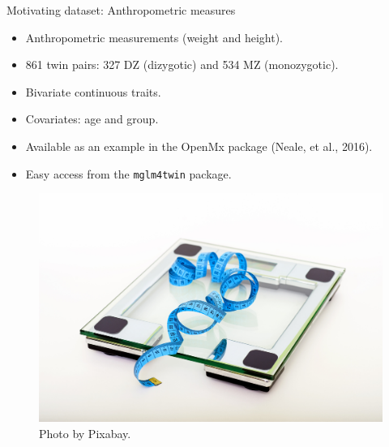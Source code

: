 \documentclass[
  ignorenonframetext,
  serif,
  professionalfont,
  usenames,
  dvipsnames,
  aspectratio = 169]{beamer}
\providecommand{\tightlist}{%
  \setlength{\itemsep}{0pt}\setlength{\parskip}{0pt}}
\renewcommand{\tightlist}{%
  \setlength{\itemsep}{0\baselineskip}
  \setlength{\parskip}{0.25\baselineskip}
}
\def\beginAHalfColumn{\begin{minipage}{0.49\textwidth}}%
\def\endColumns{\end{minipage}}%
\begin{document}
\begin{frame}[fragile]{Motivating dataset: Anthropometric measures}
\protect\hypertarget{motivating-dataset-anthropometric-measures}{}
\beginAHalfColumn

\begin{itemize}
\tightlist
\item
  Anthropometric measurements (weight and height).
\item
  861 twin pairs: 327 DZ (dizygotic) and 534 MZ (monozygotic).
\item
  Bivariate continuous traits.
\item
  Covariates: age and group.
\item
  Available as an example in the OpenMx package (Neale, et al., 2016).
\item
  Easy access from the \texttt{mglm4twin} package.
\end{itemize}

\endColumns
\beginAHalfColumn

\begin{figure}

{\centering \includegraphics[width=0.8\linewidth]{./img/balanca} 

}

\caption{Photo by Pixabay.}\label{fig:unnamed-chunk-3}
\end{figure}

\endColumns
\end{frame}
\end{document}
